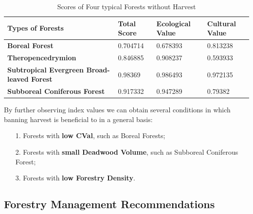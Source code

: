 \documentclass{mcmthesis}
\numberwithin{figure}{section}
\numberwithin{table}{section}
\numberwithin{equation}{section}
\begin{document}
\begin{table}[htpb!]
  \centering
  \caption{Scores of Four typical Forests without Harvest} \label{ForestScore-NoHarvest}
  \begin{tabular}{m{5.5cm}<{\centering}|m{3cm}<{\centering}|m{3cm}<{\centering}|m{3cm}<{\centering}}
  \rowcolor{lightBlue}  \textbf{Types of Forests}&\textbf{Total Score}&\textbf{Ecological Value}&\textbf{Cultural Value}\\ \hline
  \rowcolor{white} \textbf{Boreal Forest} & 0.704714 & 0.678393 & 0.813238 \\
  \rowcolor{lightBlue} \textbf{Theropencedrymion} &0.846885&0.908237&0.593933 \\
  \rowcolor{white} \textbf{Subtropical Evergreen Broad-leaved Forest} & 0.98369&0.986493 & 0.972135\\
  \rowcolor{lightBlue} \textbf{Subboreal Coniferous Forest} & 0.917332 & 0.947289 &0.79382 \\
  \end{tabular}
\end{table}

By further observing index values we can obtain several conditions in which banning
harvest is beneficial to in a general basis:
\begin{enumerate}
  \item [1.] Forests with \textbf{low CVal}, such as Boreal Forests;
  \item [2.] Forests with \textbf{small Deadwood Volume}, such as Subboreal Coniferous Forest;
  \item [3.] Forests with \textbf{low Forestry Density}.
\end{enumerate}


\subsection{Forestry Management Recommendations}
\end{document}
